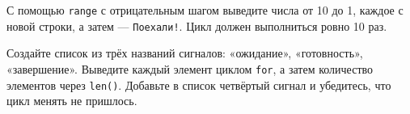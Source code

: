 \begin{taskbox}
С помощью \texttt{range} с отрицательным шагом выведите числа от 10 до 1, каждое с новой строки, а затем --- \texttt{Поехали!}. Цикл должен выполниться ровно 10 раз.
\end{taskbox}

\begin{taskbox}
Создайте список из трёх названий сигналов: «ожидание», «готовность», «завершение». Выведите каждый элемент циклом \texttt{for}, а затем количество элементов через \texttt{len()}. Добавьте в список четвёртый сигнал и убедитесь, что цикл менять не пришлось.
\end{taskbox}
